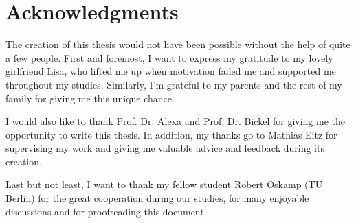 




\begingroup
\let\clearpage\relax
\let\cleardoublepage\relax
\let\cleardoublepage\relax
\chapter*{Acknowledgments}

The creation of this thesis would not have been possible without the help of
quite a few people. First and foremost, I want to express my gratitude to my
lovely girlfriend Lisa, who lifted me up when motivation failed me and
supported me throughout my studies. Similarly, I'm grateful to my parents and
the rest of my family for giving me this unique chance.

I would also like to thank Prof. Dr. Alexa and Prof. Dr. Bickel for giving me
the opportunity to write this thesis. In addition, my thanks go to Mathias Eitz
for supervising my work and giving me valuable advice and feedback during its
creation.

Last but not least, I want to thank my fellow student Robert Oskamp (TU Berlin)
for the great cooperation during our studies, for many enjoyable discussions
and for proofreading this document.

\endgroup



